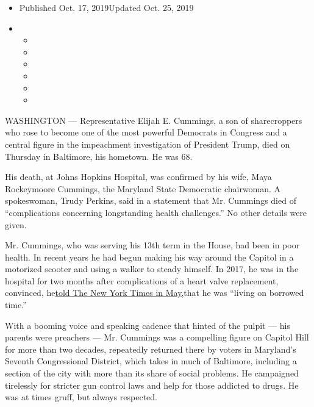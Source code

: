 \begin{itemize}
\item
  Published Oct. 17, 2019Updated Oct. 25, 2019
\item
  \begin{itemize}
  \item
  \item
  \item
  \item
  \item
  \item
  \end{itemize}
\end{itemize}

WASHINGTON --- Representative Elijah E. Cummings, a son of sharecroppers
who rose to become one of the most powerful Democrats in Congress and a
central figure in the impeachment investigation of President Trump, died
on Thursday in Baltimore, his hometown. He was 68.

His death, at Johns Hopkins Hospital, was confirmed by his wife, Maya
Rockeymoore Cummings, the Maryland State Democratic chairwoman. A
spokeswoman, Trudy Perkins, said in a statement that Mr. Cummings died
of ``complications concerning longstanding health challenges.'' No other
details were given.

Mr. Cummings, who was serving his 13th term in the House, had been in
poor health. In recent years he had begun making his way around the
Capitol in a motorized scooter and using a walker to steady himself. In
2017, he was in the hospital for two months after complications of a
heart valve replacement, convinced,
he\href{https://www.nytimes3xbfgragh.onion/2019/05/08/us/politics/elijah-cummings-trump-impeachment.html?rref=collection\%2Fbyline\%2Fsheryl-gay-stolberg\&action=click\&contentCollection=undefined\&region=stream\&module=stream_unit\&version=search\&contentPlacement=2\&pgtype=collection}{told
The New York Times in May,}that he was ``living on borrowed time.''

With a booming voice and speaking cadence that hinted of the pulpit ---
his parents were preachers --- Mr. Cummings was a compelling figure on
Capitol Hill for more than two decades, repeatedly returned there by
voters in Maryland's Seventh Congressional District, which takes in much
of Baltimore, including a section of the city with more than its share
of social problems. He campaigned tirelessly for stricter gun control
laws and help for those addicted to drugs. He was at times gruff, but
always respected.

